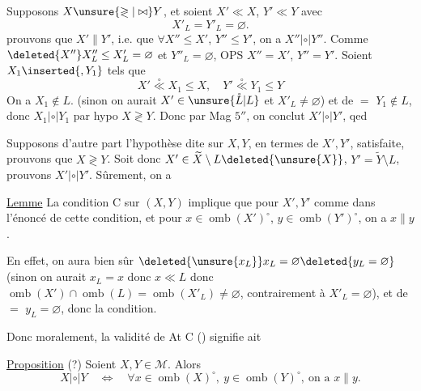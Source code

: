 Supposons $X\unsure{\gtrless|\bowtie}Y$, et soient $X'\ll X$, $Y'\ll Y$ avec
\[
X'_L=Y'_L=\varnothing.
\]
prouvons que $X'\parallel Y'$, i.e.  que  $\forall X''\leq X'$, $Y''\leq Y'$, on a $X''\mathrel{|\circ|}Y''$. Comme $\deleted{X''}X''_L\leq X'_L=\varnothing$ et   $Y''_L=\varnothing$, OPS $X''=X'$, $Y''=Y'$. Soient $X_1\inserted{,Y_1}$ tels que 
\[
X'\overset{\circ}{\ll}X_1\leq X,\quad Y'\overset{\circ}{\ll}Y_1\leq Y
\]
On a $X_1\notin L$. (sinon on aurait $X'\in\unsure{\mathring L|L}$ et $X'_L\ne\varnothing$) et de $=$ $Y_1\notin L$, donc $X_1\mathrel{|\circ|}Y_1$ par hypo $X\gtrless Y$. Donc par Mag $5''$, on conclut $X'\mathrel{|\circ|}Y'$, qed

Supposons d'autre part l'hypothèse dite sur $X,Y$, en termes de $X',Y'$, satisfaite, prouvons que $X\gtrless Y$. Soit donc $X'\in\widetilde X\setminus L\deleted{\unsure{X}}$, $Y'=\widetilde Y\setminus L$, prouvons $X'\mathrel{|\circ|}Y'$.
Sûrement, on a

\margin{$\Vert$}
\uline{Lemme} La condition C sur $(X,Y)$ implique que pour $X',Y'$ comme dans l'énoncé de cette condition, et pour $x\in\operatorname{omb}(X')^{\circ}$, $y\in\operatorname{omb}(Y')^{\circ}$, on a $x\parallel y$.


En effet, on aura bien sûr $\deleted{\unsure{x_L}}x_L=\varnothing\deleted{y_L=\varnothing}$ (sinon on aurait $x_L=x$ donc $x\ll L$  donc $\operatorname{omb}(X')\cap\operatorname{omb}(L)=\operatorname{omb}(X'_L)\ne\varnothing$, contrairement à $X'_L=\varnothing$), et de $=$ $y_L=\varnothing$, donc la condition.

Donc moralement, la validité de At C () signifie       ait

\uline{Proposition} (?) Soient $X,Y\in\mathcal M$.  Alors
\[
X\mathrel{|\circ|}Y\quad\Longleftrightarrow\quad\forall x\in\operatorname{omb}(X)^{\circ},\ y\in\operatorname{omb}(Y)^{\circ},\ \text{on a }x\parallel y.
\]
